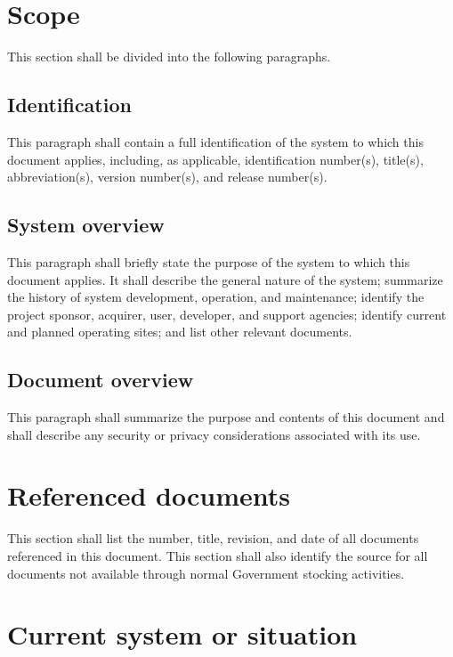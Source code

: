 \documentclass{fidata-report-template}
\begin{document}
\section{Scope}

This section shall be divided into the following paragraphs.

\subsection{Identification}

This paragraph shall contain a full identification of the system to
which this document applies, including, as applicable, identification
number(s), title(s), abbreviation(s), version number(s), and release
number(s).

\subsection{System overview}

This paragraph shall briefly state the purpose of the system to which
this document applies. It shall describe the general nature of the
system; summarize the history of system development, operation, and
maintenance; identify the project sponsor, acquirer, user, developer,
and support agencies; identify current and planned operating sites; and
list other relevant documents.

\subsection{Document overview}

This paragraph shall summarize the purpose and contents of this document
and shall describe any security or privacy considerations associated
with its use.

\section{Referenced documents}

This section shall list the number, title, revision, and date of all
documents referenced in this document. This section shall also identify
the source for all documents not available through normal Government
stocking activities.

\section{Current system or situation}
\end{document}
